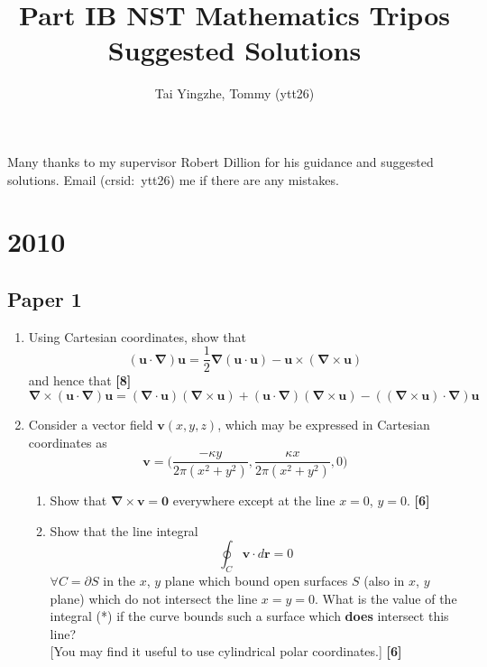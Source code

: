 \documentclass[a4paper]{article}
\title{\textbf{Part IB NST Mathematics Tripos Suggested Solutions}}
\author{Tai Yingzhe, Tommy (ytt26)}
\date{}
\begin{document}
\maketitle
\tableofcontents
\begin{foreword*}
Many thanks to my supervisor Robert Dillion for his guidance and suggested solutions. Email (crsid:~ytt26) me if there are any mistakes.
\end{foreword*}
\newpage

\section{2010}
\subsection{Paper 1}
\begin{qns}\leavevmode
\begin{enumerate}[label=(\alph*)]
    \item Using Cartesian coordinates, show that
$$(\mathbf{u}\cdot\boldsymbol{\nabla})\mathbf{u}=\frac{1}{2}\boldsymbol{\nabla}(\mathbf{u}\cdot\mathbf{u})-\mathbf{u}\times(\boldsymbol{\nabla}\times\mathbf{u})$$
and hence that \hfill
\textbf{[8]}
$$\boldsymbol{\nabla}\times(\mathbf{u}\cdot\boldsymbol{\nabla})\mathbf{u}=(\boldsymbol{\nabla}\cdot\mathbf{u})(\boldsymbol{\nabla}\times\mathbf{u})+(\mathbf{u}\cdot\boldsymbol{\nabla})(\boldsymbol{\nabla}\times\mathbf{u})-((\boldsymbol{\nabla}\times\mathbf{u})\cdot\boldsymbol{\nabla})\mathbf{u}$$
\item  Consider a vector field $\mathbf{v}(x,y,z)$, which may be expressed in Cartesian coordinates as 
$$\mathbf{v}=\bigg(\frac{-\kappa y}{2\pi(x^2+y^2)},\frac{\kappa x}{2\pi(x^2+y^2)},0\bigg)$$
\begin{enumerate}[label=(\roman*)]
    \item Show that $\boldsymbol{\nabla}\times\mathbf{v}=\boldsymbol{0}$ everywhere except at the line $x=0$, $y=0$.\hfill
\textbf{[6]}
\item Show that the line integral
\begin{equation}
\oint_C\mathbf{v}\cdot d\mathbf{r}=0\tag{*}
\end{equation}
$\forall C=\partial S$ in the $x$, $y$ plane which bound open surfaces $S$ (also in $x$, $y$ plane) which do not intersect the line $x=y=0$. What is the value of the integral (*) if the curve bounds such a surface which \textbf{does} intersect this line?\\[5pt]
[You may find it useful to use cylindrical polar coordinates.]
\hfill
\textbf{[6]}
\end{enumerate}
\end{enumerate}
\end{qns}
\end{document}

